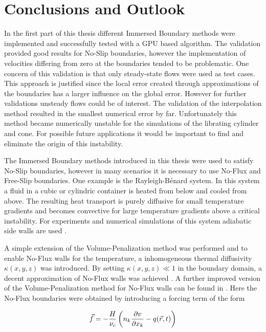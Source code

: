 \chapter*{Conclusions and Outlook}

In the first part of this thesis different Immersed Boundary methods were
implemented and successfully tested with a GPU based algorithm.
The validation provided good results for No-Slip boundaries, however the implementation of velocities differing from zero at the boundaries tended to be problematic.
One concern of this validation is that only steady-state flows were used as test cases.
This approach is justified since the local error created through approximations of the boundaries
has a larger influence on the global error.
However for further validations unsteady flows could be of interest.
The validation of the interpolation method resulted in the smallest numerical error by far.
Unfortunately this method became numerically unstable for the simulations of the librating cylinder and cone.
For possible future applications it would be important to find and eliminate the origin of this instability.

The Immersed Boundary methods introduced in this thesis were used to satisfy No-Slip boundaries, however
in many scenarios it is necessary to use No-Flux and Free-Slip boundaries.
One example is the Rayleigh-B\'{e}nard system.
In this system a fluid in a cubic or cylindric container is heated from below and cooled from above.
The resulting heat transport is purely diffusive for small temperature gradients and
becomes convective for large temperature gradients above a critical instability.
For experiments and numerical simulations of this system adiabatic side walls are used \citep{Lulff2011}.

A simple extension of the Volume-Penalization method was performed \citep{Lulff2011} and
to enable No-Flux walls for the temperature, a inhomogeneous thermal diffusivity $\kappa (x, y, z)$ was introduced.
By setting $\kappa(x, y, z) \ll 1$ in the boundary domain, a decent approximation of No-Flux walls  was achieved \citep{Lulff2011}.
A further improved version of the Volume-Penalization method for No-Flux walls can be found in \citep{Brown-Dymkoski2014}.
Here the No-Flux boundaries were obtained by introducing a forcing term of the form

\begin{align}
    \vec{f}  = -\frac{H}{\nu_c}\left( n_k\pdn[v]{x_k} - q(\vec{r}, t) \right)
\end{align}

